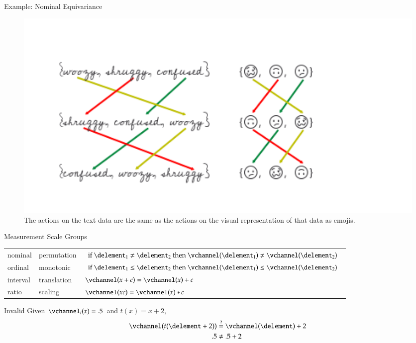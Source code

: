 \documentclass[xcolor={dvipsnames}, handout]{beamer}
\begin{document}
\begin{frame}{Example: Nominal Equivariance}
    \begin{figure}
        \includegraphics[width=1\textwidth]{figures/math/equivariance_nu.png}
        \caption{The actions on the text data are the same as the actions on the visual representation of that data as emojis.}
    \end{figure}
\end{frame}
\begin{frame}{Measurement Scale Groups}

\begin{table}[H]
    \begin{tabulary}{\textwidth}{llL}
        nominal & permutation &  $\text{if } \delement_1 \neq \delement_2 \text{ then } \vchannel (\delement_1) \neq\vchannel(\delement_2)$\\
        ordinal &  monotonic & $\text{if } \delement_1 \leq \delement_2 \text{ then } \vchannel (\delement_1) \leq \vchannel(\delement_2)$\\
        interval &  translation &  $\vchannel (x + c) = \vchannel(x) + c$ \\
        ratio &  scaling &  $\vchannel(xc) = \vchannel(x)*c $
    \end{tabulary}
\end{table}

    \pause
    \begin{block}{Invalid \vchannel}
     Given $\vchannel_{i}(x) = .5$ and $t(x) = x+2$,
    \pause    
    \begin{align*}
            \vchannel(t(\delement + 2)) & \overset{?}{=} \vchannel(\delement) + 2\\
            .5 &\neq .5 + 2
    \end{align*}
    \end{block}
\end{frame}
\end{document}
